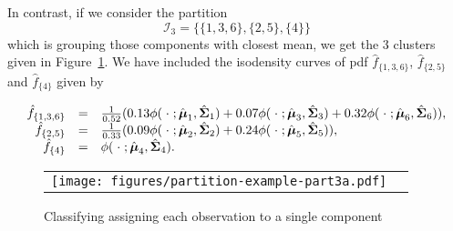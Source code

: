 \documentclass[10pt, a4paper]{article}
\newcommand{\m}[1]{\boldsymbol{#1}}
\begin{document}
In contrast, if we consider the partition
\[\mathcal{I}_3 = \{\{1, 3, 6\},\{2, 5\},\{4\}\}\]
which is grouping those components with closest mean, we get the 3 clusters given in Figure~\ref{ex_part3a}. We have included the isodensity curves of pdf $\hat{f}_{\{1,3,6\}}$, $\hat{f}_{\{2, 5\}}$ and $\hat{f}_{\{4\}}$ given by

\[ 
\begin{array}{r c l}
\hat{f}_{\{1,3,6\}} & = & \frac{1}{0.52}(0.13 \phi(\;\cdot\; ; \hat{\m\mu}_1, \hat{\m\Sigma}_1) + 0.07 \phi(\;\cdot\; ; \hat{\m\mu}_3, \hat{\m\Sigma}_3) + 0.32 \phi(\;\cdot\; ; \hat{\m\mu}_6, \hat{\m\Sigma}_6)), \\
\hat{f}_{\{2, 5\}} & = &  \frac{1}{0.33}(0.09 \phi(\;\cdot\; ; \hat{\m\mu}_2, \hat{\m\Sigma}_2) + 0.24 \phi(\;\cdot\; ; \hat{\m\mu}_5, \hat{\m\Sigma}_5)), \\
\hat{f}_{\{4\}} & = &\phi(\;\cdot\; ; \hat{\m\mu}_4, \hat{\m\Sigma}_4).
\end{array} 
\]
  


\begin{figure}[!h]
\begin{center}
\begin{tabular}{cc}
  \texttt{[image: figures/partition-example-part3a.pdf]} \\
 \end{tabular}
 \caption{Classifying assigning each observation to a single component}\label{ex_part3a}
\end{center}
\end{figure}

%
\end{document}
